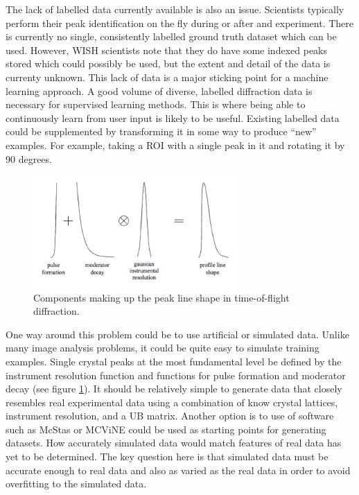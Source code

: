 \documentclass[paper=a4, fontsize=8pt]{scrartcl} \usepackage[T1]{fontenc}
\begin{document}
The lack of labelled data currently available is also an issue. Scientists
typically perform their peak identification on the fly during or after and experiment. There is
currently no single, consistently labelled ground truth dataset which can be
used. However, WISH scientists note that they do have some indexed peaks stored
which could possibly be used, but the extent and detail of the data is currenty unknown. 
This lack of data is a major sticking point for a machine 
learning approach. A good volume of diverse, labelled diffraction data is 
necessary for supervised learning methods. This is where being able to 
continuously learn from user input is likely to be useful. Existing labelled data could
be supplemented by transforming it in some way to produce ``new'' examples. For example,
taking a ROI with a single peak in it and rotating it by 90 degrees.

\begin{figure}[H]
\centering
\includegraphics[width=0.7\textwidth]{peak-profile.png}
\caption{Components making up the peak line shape in time-of-flight diffraction.}
\label{fig:peak-profile}
\end{figure}

One way around this problem could be to use artificial or simulated data. Unlike 
many image analysis problems, it could be quite easy to simulate training
examples. Single crystal peaks at the most fundamental level be defined by the
instrument resolution function and functions for pulse formation and moderator
decay (see figure \ref{fig:peak-profile}). It should be relatively simple to 
generate data that closely resembles real experimental data using a combination of
know crystal lattices, instrument resolution, and a UB matrix. Another option is 
to use of software such as McStas 
\cite{McStas} or MCViNE \cite{MCViNE} could be used as starting points for 
generating datasets. How accurately simulated data would match features of real 
data has yet to be determined. The key question here is that simulated data must be 
accurate enough to real data and also as varied as the real data in order to avoid
overfitting to the simulated data.
\end{document}
